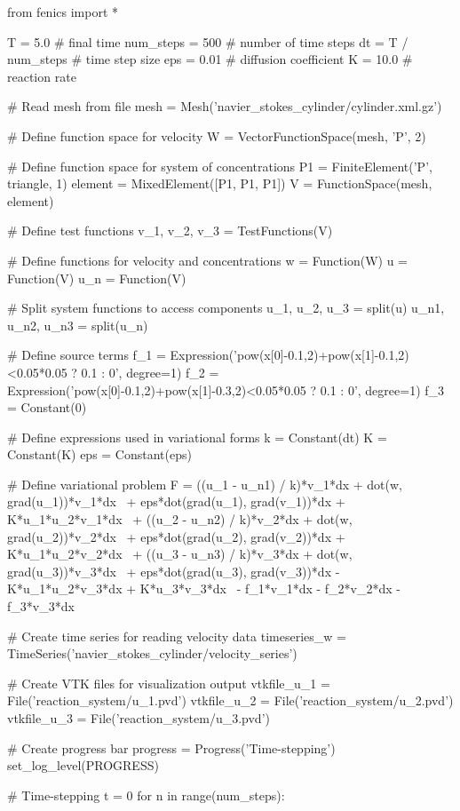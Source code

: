 \begin{python}
from fenics import *

T = 5.0            # final time
num_steps = 500    # number of time steps
dt = T / num_steps # time step size
eps = 0.01         # diffusion coefficient
K = 10.0           # reaction rate

# Read mesh from file
mesh = Mesh('navier_stokes_cylinder/cylinder.xml.gz')

# Define function space for velocity
W = VectorFunctionSpace(mesh, 'P', 2)

# Define function space for system of concentrations
P1 = FiniteElement('P', triangle, 1)
element = MixedElement([P1, P1, P1])
V = FunctionSpace(mesh, element)

# Define test functions
v_1, v_2, v_3 = TestFunctions(V)

# Define functions for velocity and concentrations
w = Function(W)
u = Function(V)
u_n = Function(V)

# Split system functions to access components
u_1, u_2, u_3 = split(u)
u_n1, u_n2, u_n3 = split(u_n)

# Define source terms
f_1 = Expression('pow(x[0]-0.1,2)+pow(x[1]-0.1,2)<0.05*0.05 ? 0.1 : 0',
                 degree=1)
f_2 = Expression('pow(x[0]-0.1,2)+pow(x[1]-0.3,2)<0.05*0.05 ? 0.1 : 0',
                 degree=1)
f_3 = Constant(0)

# Define expressions used in variational forms
k = Constant(dt)
K = Constant(K)
eps = Constant(eps)

# Define variational problem
F = ((u_1 - u_n1) / k)*v_1*dx + dot(w, grad(u_1))*v_1*dx \
  + eps*dot(grad(u_1), grad(v_1))*dx + K*u_1*u_2*v_1*dx  \
  + ((u_2 - u_n2) / k)*v_2*dx + dot(w, grad(u_2))*v_2*dx \
  + eps*dot(grad(u_2), grad(v_2))*dx + K*u_1*u_2*v_2*dx  \
  + ((u_3 - u_n3) / k)*v_3*dx + dot(w, grad(u_3))*v_3*dx \
  + eps*dot(grad(u_3), grad(v_3))*dx - K*u_1*u_2*v_3*dx + K*u_3*v_3*dx \
  - f_1*v_1*dx - f_2*v_2*dx - f_3*v_3*dx

# Create time series for reading velocity data
timeseries_w = TimeSeries('navier_stokes_cylinder/velocity_series')

# Create VTK files for visualization output
vtkfile_u_1 = File('reaction_system/u_1.pvd')
vtkfile_u_2 = File('reaction_system/u_2.pvd')
vtkfile_u_3 = File('reaction_system/u_3.pvd')

# Create progress bar
progress = Progress('Time-stepping')
set_log_level(PROGRESS)

# Time-stepping
t = 0
for n in range(num_steps):


\end{python}
